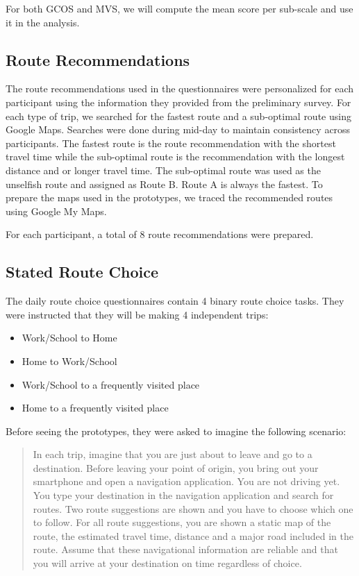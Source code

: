 For both GCOS and MVS, we will compute the mean score per sub-scale and use it in the analysis.

\subsection{Route Recommendations}
The route recommendations used in the questionnaires were personalized for each participant using the information they provided from the preliminary survey. For each type of trip, we searched for the fastest route and a sub-optimal route using Google Maps. Searches were done during mid-day to maintain consistency across participants. The fastest route is the route recommendation with the shortest travel time while the sub-optimal route is the recommendation with the longest distance and or longer travel time. The sub-optimal route was used as the unselfish route and assigned as Route B. Route A is always the fastest. To prepare the maps used in the prototypes, we traced the recommended routes using Google My Maps. 

For each participant, a total of 8 route recommendations were prepared. 

\subsection{Stated Route Choice}
The daily route choice questionnaires contain 4 binary route choice tasks. They were instructed that they will be making 4 independent trips: 
\begin{itemize}
    \item Work/School to Home
    \item Home to Work/School
    \item Work/School to a frequently visited place
    \item Home to a frequently visited place 
\end{itemize}

Before seeing the prototypes, they were asked to imagine the following scenario:
\begin{quote}
    In each trip, imagine that you are just about to leave and go to a destination. Before leaving your point of origin, you bring out your smartphone and open a navigation application. You are not driving yet. You type your destination in the navigation application and search for routes. Two route suggestions are shown and you have to choose which one to follow. For all route suggestions, you are shown a static map of the route, the estimated travel time, distance and a major road included in the route. Assume that these navigational information are reliable and that you will arrive at your destination on time regardless of choice. 
\end{quote}


